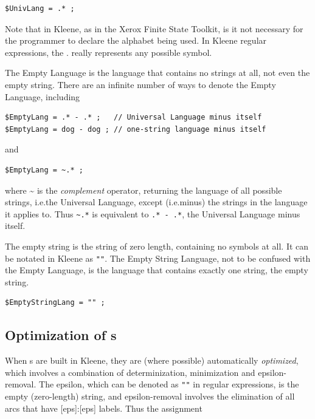 \begin{Verbatim}
$UnivLang = .* ;
\end{Verbatim}

\noindent
Note that in Kleene, as in the Xerox Finite State Toolkit, is it not necessary
for the programmer to declare the alphabet being used.  In Kleene regular
expressions, the . really represents any possible symbol.

The Empty Language is the language that contains no strings at all, not even the empty
string.  There are an infinite number of ways to denote the Empty Language, including

\begin{Verbatim}
$EmptyLang = .* - .* ;   // Universal Language minus itself
$EmptyLang = dog - dog ; // one-string language minus itself
\end{Verbatim}

\noindent
and

\begin{Verbatim}
$EmptyLang = ~.* ;
\end{Verbatim}

\noindent
where \~{} is the \emph{complement} operator, returning the language of all possible
strings, i.e.\@ the Universal Language, except
(i.e.\@ minus) the strings in the language it applies to.  Thus \texttt{\~{}.*} is
equivalent to \texttt{.* - .*}, the Universal Language minus itself.

The empty string is the string of zero length, containing no symbols at all.  It can be
notated in Kleene as \verb!""!.  The Empty String Language, not to be confused with the Empty
Language, is the language that contains exactly one string, the empty string.

\begin{Verbatim}
$EmptyStringLang = "" ;
\end{Verbatim}

\subsection{Optimization of \fsm{}s}

When \fsm{}s are built in Kleene, they are (where possible) automatically \emph{optimized}, which involves a
combination of determinization, minimization and epsilon-removal.  The epsilon, which can be
denoted as \verb!""! in regular expressions, is the empty
(zero-length) string, and epsilon-removal involves the
elimination of all arcs that have [eps]:[eps] labels.  Thus the assignment


